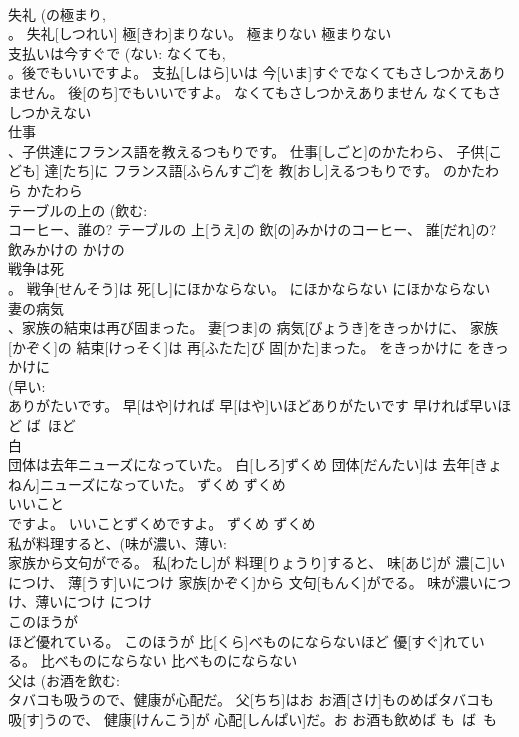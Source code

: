 \documentclass[8pt]{extreport}
\begin{document}
\begin{CJK}{UTF8}{min}
\\	失礼 (の極まり, 
\\	。	失礼[しつれい] 極[きわ]まりない。	極まりない	極まりない	
\\	支払いは今すぐで (ない: なくても, 
\\	。後でもいいですよ。	支払[しはら]いは 今[いま]すぐでなくてもさしつかえありません。 後[のち]でもいいですよ。	なくてもさしつかえありません	なくてもさしつかえない	
\\	仕事 
\\	、子供達にフランス語を教えるつもりです。	仕事[しごと]のかたわら、 子供[こども] 達[たち]に フランス語[ふらんすご]を 教[おし]えるつもりです。	のかたわら	かたわら	
\\	テーブルの上の (飲む: 
\\	コーヒー、誰の?	テーブルの 上[うえ]の 飲[の]みかけのコーヒー、 誰[だれ]の?	飲みかけの	かけの~	
\\	戦争は死 
\\	。	戦争[せんそう]は 死[し]にほかならない。	にほかならない	にほかならない	
\\	妻の病気 
\\	、家族の結束は再び固まった。	妻[つま]の 病気[びょうき]をきっかけに、 家族[かぞく]の 結束[けっそく]は 再[ふたた]び 固[かた]まった。	をきっかけに	をきっかけに	
\\	(早い: 
\\	ありがたいです。	早[はや]ければ 早[はや]いほどありがたいです	早ければ早いほど	ば~ほど	
\\	白 
\\	団体は去年ニューズになっていた。	白[しろ]ずくめ 団体[だんたい]は 去年[きょねん]ニューズになっていた。	ずくめ	ずくめ	
\\	いいこと 
\\	ですよ。	いいことずくめですよ。	ずくめ	ずくめ	
\\	私が料理すると、(味が濃い、薄い: 
\\	家族から文句がでる。	私[わたし]が 料理[りょうり]すると、 味[あじ]が 濃[こ]いにつけ、 薄[うす]いにつけ 家族[かぞく]から 文句[もんく]がでる。	味が濃いにつけ、薄いにつけ	につけ	
\\	このほうが 
\\	ほど優れている。	このほうが 比[くら]べものにならないほど 優[すぐ]れている。	比べものにならない	比べものにならない	
\\	父は (お酒を飲む: 
\\	タバコも吸うので、健康が心配だ。	父[ちち]はお お酒[さけ]ものめばタバコも 吸[す]うので、 健康[けんこう]が 心配[しんぱい]だ。お	お酒も飲めば	も~ば~も	

\end{CJK}
\end{document}
